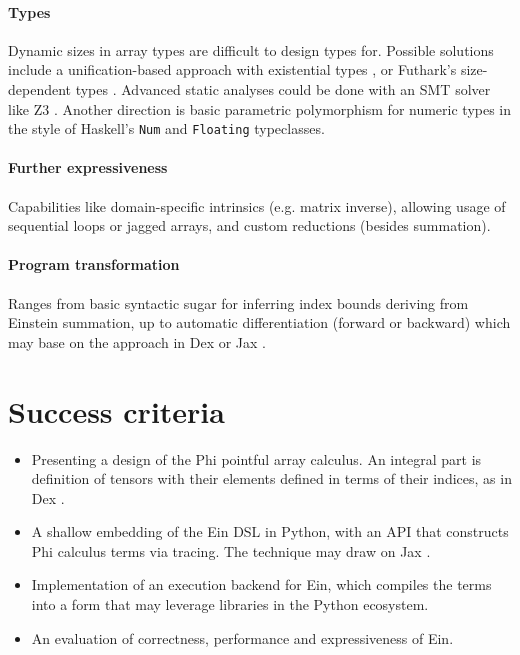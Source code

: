 \paragraph{Types} Dynamic sizes in array types are difficult to design types for. Possible solutions include a unification-based approach with existential types , or Futhark's size-dependent types \cite{henriksen2021towards}. Advanced static analyses could be done with an SMT solver like Z3 . Another direction is basic parametric polymorphism for numeric types in the style of Haskell's \texttt{Num} and \texttt{Floating} typeclasses. 

\paragraph{Further expressiveness} Capabilities like domain-specific intrinsics (e.g. matrix inverse), allowing usage of sequential loops or jagged arrays, and custom reductions (besides summation).

\paragraph{Program transformation} Ranges from basic syntactic sugar for inferring index bounds deriving from Einstein summation, up to automatic differentiation (forward or backward) which may base on the approach in Dex \cite{paszke2021getting} or Jax \cite{frostig2018compiling}. 

\section{Success criteria}

\begin{itemize}
    \item Presenting a design of the Phi pointful array calculus. An integral part is definition of tensors with their elements defined in terms of their indices, as in Dex \cite{paszke2021getting}.
    \item A shallow embedding of the Ein DSL in Python, with an API that constructs Phi calculus terms via tracing. The technique may draw on Jax \cite{frostig2018compiling}.
    \item Implementation of an execution backend for Ein, which compiles the terms into a form that may leverage libraries in the Python ecosystem.
    \item An evaluation of correctness, performance and expressiveness of Ein.
\end{itemize}

